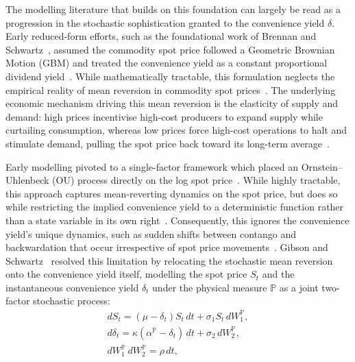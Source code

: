 \documentclass[sigconf, authorversion=true, nonacm=true]{acmart}
\begin{document}
\label{sec:lit_commodity}

The modelling literature that builds on this foundation can largely be read as a progression in the stochastic sophistication granted to the convenience yield $\delta$. Early reduced-form efforts, such as the foundational work of Brennan and Schwartz~\cite{Brennan1985EvaluatingInvestments}, assumed the commodity spot price followed a Geometric Brownian Motion (GBM) and treated the convenience yield as a constant proportional dividend yield~\cite{Gibson1990StochasticClaims}. While mathematically tractable, this formulation neglects the empirical reality of mean reversion in commodity spot prices~\cite{Schwartz1997TheHedging, bessembinder1995mean}. The underlying economic mechanism driving this mean reversion is the elasticity of supply and demand: high prices incentivise high-cost producers to expand supply while curtailing consumption, whereas low prices force high-cost operations to halt and stimulate demand, pulling the spot price back toward its long-term average~\cite{Schwartz1997TheHedging}.

Early modelling pivoted to a single-factor framework which placed an Ornstein--Uhlenbeck (OU) process directly on the log spot price~\cite{Schwartz1997TheHedging, krul2008calibration, Liu2009No-ArbitrageStructures}. While highly tractable, this approach captures mean-reverting dynamics on the spot price, but does so while restricting the implied convenience yield to a deterministic function rather than a state variable in its own right~\cite{Schwartz1997TheHedging}. Consequently, this ignores the convenience yield's unique dynamics, such as sudden shifts between contango and backwardation that occur irrespective of spot price movements~\cite{Schwartz1997TheHedging, Liu2009No-ArbitrageStructures}. Gibson and Schwartz~\cite{Gibson1990StochasticClaims} resolved this limitation by relocating the stochastic mean reversion onto the convenience yield itself, modelling the spot price $S_t$ and the instantaneous convenience yield $\delta_t$ under the physical measure $\mathbb{P}$ as a joint two-factor stochastic process:
\begin{gather} \label{eq:gibson_schwartz_physical}
dS_t = (\mu-\delta_t)S_t\,dt + \sigma_1 S_t\, dW_1^{\mathbb{P}}, \label{sde1} \\
d\delta_t = \kappa(\alpha^{\mathbb{P}}-\delta_t)\,dt + \sigma_2\, dW_2^{\mathbb{P}}, \label{sde2} \\
dW_1^{\mathbb{P}}\, dW_2^{\mathbb{P}} = \rho\, dt, \label{eq:gs_corr}
\end{gather}
\end{document}
